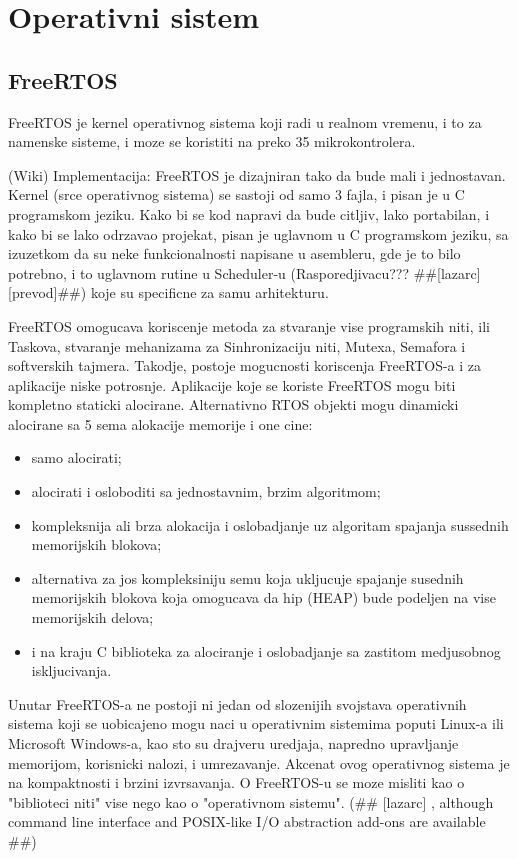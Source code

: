 \documentclass[a4paper,12pt, master]{etf}
\begin{document}
	\chapter{Operativni sistem}

	\section{FreeRTOS}

	FreeRTOS je kernel operativnog sistema koji radi u realnom vremenu, i to za namenske sisteme, i
	moze se koristiti na preko 35 mikrokontrolera.

	(Wiki) Implementacija:
	FreeRTOS je dizajniran tako da bude mali i jednostavan. Kernel (srce operativnog sistema) se
	sastoji od samo 3 fajla, i pisan je u C programskom jeziku. Kako bi se kod napravi da bude
	citljiv, lako portabilan, i kako bi se lako odrzavao projekat, pisan je uglavnom u C
	programskom jeziku, sa izuzetkom da su neke funkcionalnosti napisane u asembleru, gde je to
	bilo potrebno, i to uglavnom rutine u Scheduler-u (Rasporedjivacu??? \#\#[lazarc] [prevod]\#\#)
	koje su specificne za samu arhitekturu.

	FreeRTOS omogucava koriscenje metoda za stvaranje vise programskih niti, ili Taskova, stvaranje
	mehanizama za Sinhronizaciju niti, Mutexa, Semafora i softverskih tajmera. Takodje, postoje
	mogucnosti koriscenja FreeRTOS-a i za aplikacije niske potrosnje. Aplikacije koje se koriste
	FreeRTOS mogu biti kompletno staticki alocirane. Alternativno RTOS objekti mogu dinamicki
	alocirane sa 5 sema alokacije memorije i one cine:
	\begin{itemize}
		\item samo alocirati;
		\item alocirati i osloboditi sa jednostavnim, brzim algoritmom;
		\item kompleksnija ali brza alokacija i oslobadjanje uz algoritam spajanja sussednih
		memorijskih blokova;
		\item alternativa za jos kompleksiniju semu koja ukljucuje spajanje susednih memorijskih
		blokova	koja omogucava da hip (HEAP) bude podeljen na vise memorijskih delova;
		\item i na kraju C biblioteka za alociranje i oslobadjanje sa zastitom medjusobnog iskljucivanja.
	\end{itemize}

	Unutar FreeRTOS-a ne postoji ni jedan od slozenijih svojstava operativnih sistema koji se
	uobicajeno mogu naci u operativnim sistemima poputi Linux-a ili Microsoft Windows-a, kao sto su
	drajveru uredjaja, napredno upravljanje memorijom, korisnicki nalozi, i umrezavanje. Akcenat
	ovog operativnog sistema je na kompaktnosti i brzini izvrsavanja. O FreeRTOS-u se moze misliti
	kao o "biblioteci niti" vise nego kao o "operativnom sistemu". (\#\# [lazarc] , although command
	line interface and POSIX-like I/O abstraction add-ons are available \#\#)
\end{document}
